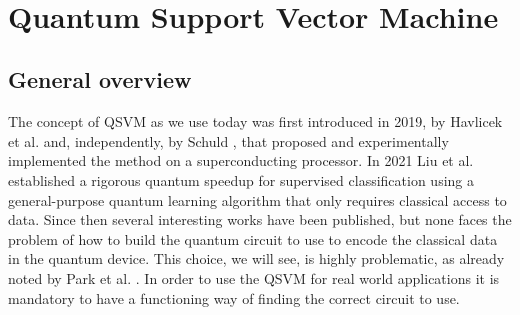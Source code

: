 \documentclass[12pt]{article}
\begin{document}
\newpage \,
\newpage
\section{Quantum Support Vector Machine}
\subsection{General overview}
The concept of QSVM as we use today was first introduced in 2019, by Havlicek et al. \cite{havlicek2019} and, independently, by Schuld \cite{schuld2018}, that proposed and experimentally implemented the method on a superconducting processor. In 2021 Liu et al. established a rigorous quantum speedup for supervised classification using a general-purpose quantum learning algorithm that only requires classical access to data. Since then several interesting works have been published, but none faces the problem of how to build the quantum circuit to use to encode the classical data in the quantum device. This choice, we will see, is highly problematic, as already noted by Park et al. \cite{park2020}. In order to use the QSVM for real world applications it is mandatory to have a functioning way of finding the correct circuit to use.
\end{document}

